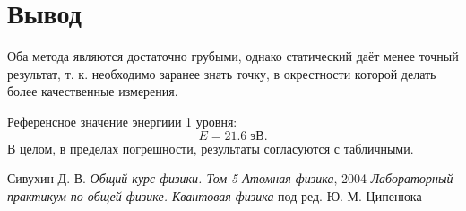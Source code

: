 \documentclass[a4paper]{article}
\begin{document}
\section{Вывод}

Оба метода являются достаточно грубыми, однако статический даёт менее точный результат, т. к. необходимо заранее знать точку, в окрестности которой делать более качественные измерения. 

Референсное значение энергиии 1 уровня:
\begin{equation*}\label{key}
	E = 21.6 \;эВ.
\end{equation*}
В целом, в пределах погрешности, результаты согласуются с табличными.


\newpage

\begin{thebibliography}{9}
	 Сивухин Д. В. \emph{Общий курс физики. Том 5 Атомная физика}, 2004
	 \emph{Лабораторный практикум по общей физике. Квантовая физика} под ред. Ю. М. Ципенюка
\end{thebibliography}
\end{document}
